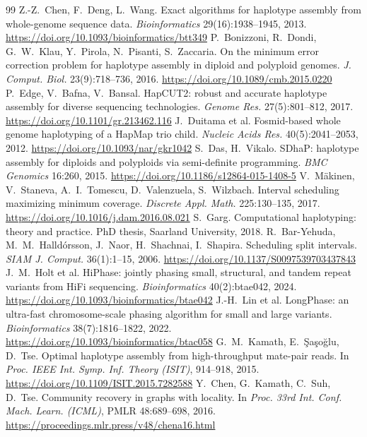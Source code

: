 \begin{thebibliography}{99}
 Z.-Z.~Chen, F.~Deng, L.~Wang. Exact algorithms for haplotype assembly from whole-genome sequence data. \emph{Bioinformatics} 29(16):1938--1945, 2013. \url{https://doi.org/10.1093/bioinformatics/btt349}
 P.~Bonizzoni, R.~Dondi, G.~W.~Klau, Y.~Pirola, N.~Pisanti, S.~Zaccaria. On the minimum error correction problem for haplotype assembly in diploid and polyploid genomes. \emph{J. Comput. Biol.} 23(9):718--736, 2016. \url{https://doi.org/10.1089/cmb.2015.0220}
 P.~Edge, V.~Bafna, V.~Bansal. HapCUT2: robust and accurate haplotype assembly for diverse sequencing technologies. \emph{Genome Res.} 27(5):801--812, 2017. \url{https://doi.org/10.1101/gr.213462.116}
 J.~Duitama et al. Fosmid-based whole genome haplotyping of a HapMap trio child. \emph{Nucleic Acids Res.} 40(5):2041--2053, 2012. \url{https://doi.org/10.1093/nar/gkr1042}
 S.~Das, H.~Vikalo. SDhaP: haplotype assembly for diploids and polyploids via semi-definite programming. \emph{BMC Genomics} 16:260, 2015. \url{https://doi.org/10.1186/s12864-015-1408-5}
 V.~M\"akinen, V.~Staneva, A.~I.~Tomescu, D.~Valenzuela, S.~Wilzbach. Interval scheduling maximizing minimum coverage. \emph{Discrete Appl. Math.} 225:130--135, 2017. \url{https://doi.org/10.1016/j.dam.2016.08.021}
 S.~Garg. Computational haplotyping: theory and practice. PhD thesis, Saarland University, 2018.
 R.~Bar-Yehuda, M.~M.~Halld\'orsson, J.~Naor, H.~Shachnai, I.~Shapira. Scheduling split intervals. \emph{SIAM J. Comput.} 36(1):1--15, 2006. \url{https://doi.org/10.1137/S0097539703437843}
 J.~M.~Holt et al. HiPhase: jointly phasing small, structural, and tandem repeat variants from HiFi sequencing. \emph{Bioinformatics} 40(2):btae042, 2024. \url{https://doi.org/10.1093/bioinformatics/btae042}
 J.-H.~Lin et al. LongPhase: an ultra-fast chromosome-scale phasing algorithm for small and large variants. \emph{Bioinformatics} 38(7):1816--1822, 2022. \url{https://doi.org/10.1093/bioinformatics/btac058}
 G.~M.~Kamath, E.~\c{S}a\c{s}o\u{g}lu, D.~Tse. Optimal haplotype assembly from high-throughput mate-pair reads. In \emph{Proc. IEEE Int. Symp. Inf. Theory (ISIT)}, 914--918, 2015. \url{https://doi.org/10.1109/ISIT.2015.7282588}
 Y.~Chen, G.~Kamath, C.~Suh, D.~Tse. Community recovery in graphs with locality. In \emph{Proc. 33rd Int. Conf. Mach. Learn. (ICML)}, PMLR 48:689--698, 2016. \url{https://proceedings.mlr.press/v48/chena16.html}

\end{thebibliography}
